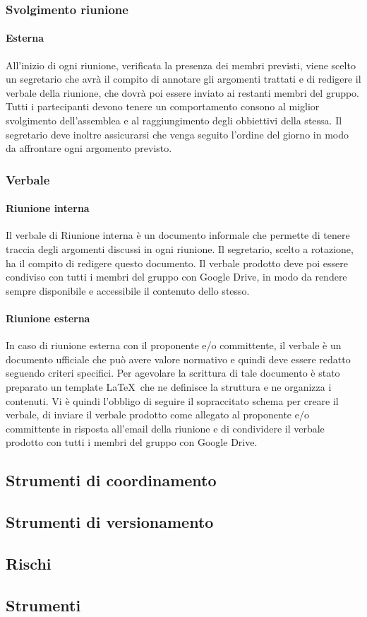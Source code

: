 \documentclass[../NormeDiProgetto.tex]{subfiles}
\begin{document}
				\subsubsection{Svolgimento riunione}
					\paragraph{Esterna\\}
						All'inizio di ogni riunione, verificata la presenza dei membri previsti, viene scelto un segretario che avrà il compito di annotare gli argomenti trattati e di redigere il verbale della riunione, che dovrà poi essere inviato ai restanti membri del gruppo. 
						Tutti i partecipanti devono tenere un comportamento consono al miglior svolgimento dell'assemblea e al raggiungimento degli obbiettivi della stessa. Il segretario deve inoltre assicurarsi che venga seguito l'ordine del giorno in modo da affrontare ogni argomento previsto.
				\subsubsection{Verbale}
					\paragraph{Riunione interna\\}
						Il verbale di Riunione interna è un documento informale che permette di tenere traccia degli argomenti discussi in ogni riunione. Il segretario, scelto a rotazione, ha il compito di redigere questo documento. Il verbale prodotto deve poi essere condiviso con tutti i membri del gruppo con Google Drive, in modo da rendere sempre disponibile e accessibile il contenuto dello stesso.
					\paragraph{Riunione esterna\\}
						In caso di riunione esterna con il proponente e/o committente, il verbale è un documento ufficiale che può avere valore normativo e quindi deve essere redatto seguendo criteri specifici.
						Per agevolare la scrittura di tale documento è stato preparato un template \LaTeX\ che ne definisce la struttura e ne organizza i contenuti. Vi è quindi l'obbligo di seguire il sopraccitato schema per creare il verbale, di inviare il verbale prodotto come allegato al proponente e/o committente in risposta all'email della riunione e di condividere il 
						verbale prodotto con tutti i membri del gruppo con Google Drive.
		\subsection{Strumenti di coordinamento}
		\subsection{Strumenti di versionamento}
		\subsection{Rischi}
		\subsection{Strumenti}
\end{document}

